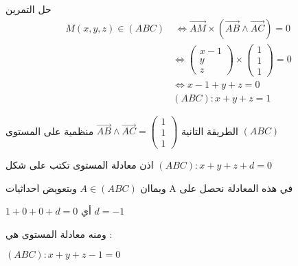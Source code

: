 \begin{frame}[fragile,label=sol3bis]
\begin{block} {حل التمرين}
 	\begin{align*}
	M(x,y,z) \in (ABC) & ~\iff  \overrightarrow{AM} \times (\overrightarrow{AB} \land \overrightarrow{AC})=0  \\
	&\iff \begin{pmatrix}x-1 \\y\\ z\end{pmatrix} \times \begin{pmatrix}1 \\1\\ 1
	\end{pmatrix}=0 \\
	& \iff x-1+y+z=0 \\
	& (ABC):x+y+z=1
	\end{align*} 
	\hyperlink{sol3bisautre}{}
	\hyperlink{ex3}{}
\end{block}
\end{frame}
	\begin{frame}[label=sol3bisautre]
	\begin{block} {الطريقة التانية}
		$ \overrightarrow{AB} \land \overrightarrow{AC}=\begin{pmatrix}1 \\1\\ 1
		\end{pmatrix} $
		منظمية على المستوى $ (ABC) $ 
		
		اذن معادلة المستوى تكتب على شكل 
		$ (ABC):x+y+z+d=0 $
		
		وبماان 
		 $ A \in (ABC) $
		وبتعويض احداثيات A في هذه المعادلة نحصل على 
		
		$ 1+0+0+d=0 $
		أي
		$ d=-1 $
		
		ومنه معادلة المستوى هي :

			$ (ABC):x+y+z-1=0 $
		 
		\hyperlink{ex3}{}
	\end{block}
\end{frame}